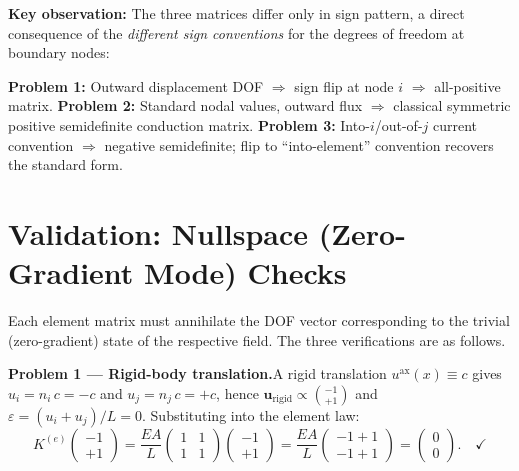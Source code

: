 \documentclass[11pt, a4paper]{article}
\begin{document}
\vspace{0.3cm}

\noindent \textbf{Key observation:} The three matrices differ only in sign pattern, a direct consequence of the \textit{different sign conventions} for the degrees of freedom at boundary nodes:

\textbf{Problem 1:} Outward displacement DOF $\Rightarrow$ sign flip at node $i$ $\Rightarrow$ all-positive matrix.
\textbf{Problem 2:} Standard nodal values, outward flux $\Rightarrow$ classical symmetric positive semidefinite conduction matrix.
\textbf{Problem 3:} Into-$i$/out-of-$j$ current convention $\Rightarrow$ negative semidefinite; flip to ``into-element'' convention recovers the standard form.

\section{Validation: Nullspace (Zero-Gradient Mode) Checks}\label{sec:validation}

Each element matrix must annihilate the DOF vector corresponding to the trivial (zero-gradient) state of the respective field.  The three verifications are as follows.

\medskip
\noindent\textbf{Problem 1 --- Rigid-body translation.}\quad A rigid translation $u^{\mathrm{ax}}(x)\equiv c$ gives $u_i = n_i\,c = -c$ and $u_j = n_j\,c = +c$, hence $\mathbf{u}_{\mathrm{rigid}}\propto\binom{-1}{+1}$ and $\varepsilon = (u_i+u_j)/L = 0$.  Substituting into the element law:
\[
K^{(e)}\!\begin{pmatrix}-1\\+1\end{pmatrix}
=\frac{EA}{L}\!\begin{pmatrix}1&1\\1&1\end{pmatrix}\!\begin{pmatrix}-1\\+1\end{pmatrix}
=\frac{EA}{L}\!\begin{pmatrix}-1+1\\-1+1\end{pmatrix}
=\begin{pmatrix}0\\0\end{pmatrix}.\quad\checkmark
\]
\end{document}
